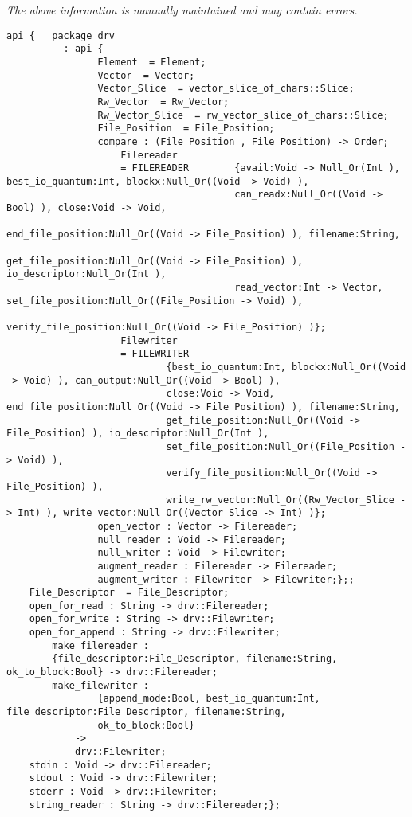\label{pkg:winix\_text\_file\_io\_driver\_for\_posix\_\_premicrothread}

{\tiny \it The above information is manually maintained and may contain errors.}
\begin{verbatim}
api {   package drv
          : api {
                Element  = Element;
                Vector  = Vector;
                Vector_Slice  = vector_slice_of_chars::Slice;
                Rw_Vector  = Rw_Vector;
                Rw_Vector_Slice  = rw_vector_slice_of_chars::Slice;
                File_Position  = File_Position;
                compare : (File_Position , File_Position) -> Order;
                    Filereader
                    = FILEREADER        {avail:Void -> Null_Or(Int ), best_io_quantum:Int, blockx:Null_Or((Void -> Void) ),
                                        can_readx:Null_Or((Void -> Bool) ), close:Void -> Void,
                                        end_file_position:Null_Or((Void -> File_Position) ), filename:String,
                                        get_file_position:Null_Or((Void -> File_Position) ), io_descriptor:Null_Or(Int ),
                                        read_vector:Int -> Vector, set_file_position:Null_Or((File_Position -> Void) ),
                                        verify_file_position:Null_Or((Void -> File_Position) )};
                    Filewriter
                    = FILEWRITER
                            {best_io_quantum:Int, blockx:Null_Or((Void -> Void) ), can_output:Null_Or((Void -> Bool) ),
                            close:Void -> Void, end_file_position:Null_Or((Void -> File_Position) ), filename:String,
                            get_file_position:Null_Or((Void -> File_Position) ), io_descriptor:Null_Or(Int ),
                            set_file_position:Null_Or((File_Position -> Void) ),
                            verify_file_position:Null_Or((Void -> File_Position) ),
                            write_rw_vector:Null_Or((Rw_Vector_Slice -> Int) ), write_vector:Null_Or((Vector_Slice -> Int) )};
                open_vector : Vector -> Filereader;
                null_reader : Void -> Filereader;
                null_writer : Void -> Filewriter;
                augment_reader : Filereader -> Filereader;
                augment_writer : Filewriter -> Filewriter;};;
    File_Descriptor  = File_Descriptor;
    open_for_read : String -> drv::Filereader;
    open_for_write : String -> drv::Filewriter;
    open_for_append : String -> drv::Filewriter;
        make_filereader :
        {file_descriptor:File_Descriptor, filename:String, ok_to_block:Bool} -> drv::Filereader;
        make_filewriter :
                {append_mode:Bool, best_io_quantum:Int, file_descriptor:File_Descriptor, filename:String,
                ok_to_block:Bool}
            ->
            drv::Filewriter;
    stdin : Void -> drv::Filereader;
    stdout : Void -> drv::Filewriter;
    stderr : Void -> drv::Filewriter;
    string_reader : String -> drv::Filereader;};
\end{verbatim}

